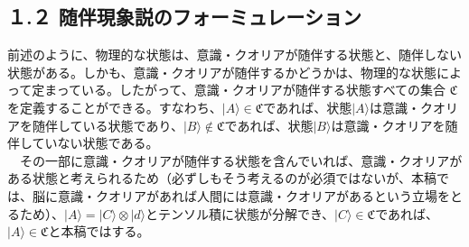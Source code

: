 \subsection{１.２ 随伴現象説のフォーミュレーション}

前述のように、物理的な状態は、意識・クオリアが随伴する状態と、随伴しない状態がある。しかも、意識・クオリアが随伴するかどうかは、物理的な状態によって定まっている。したがって、意識・クオリアが随伴する状態すべての集合 $\mathfrak{C}$ を定義することができる。すなわち、$|A\rangle\in\mathfrak{C}$であれば、状態$|A\rangle$は意識・クオリアを随伴している状態であり、$|B\rangle\notin\mathfrak{C}$であれば、状態$|B\rangle$は意識・クオリアを随伴していない状態である。\\
　その一部に意識・クオリアが随伴する状態を含んでいれば、意識・クオリアがある状態と考えられるため（必ずしもそう考えるのが必須ではないが、本稿では、脳に意識・クオリアがあれば人間には意識・クオリアがあるという立場をとるため）、$|A\rangle = |C\rangle\otimes |d\rangle$とテンソル積に状態が分解でき、$|C\rangle\in\mathfrak{C}$であれば、$|A\rangle\in\mathfrak{C}$と本稿ではする。